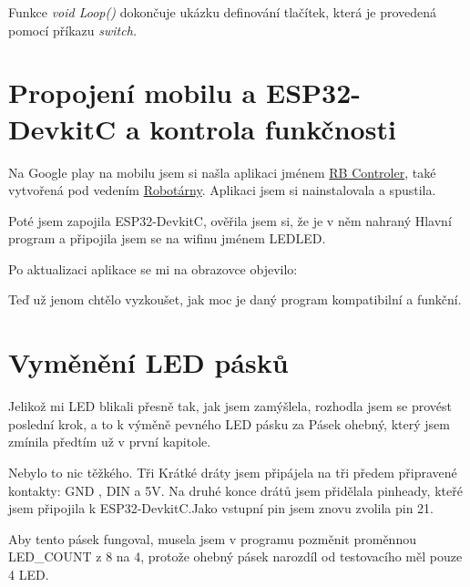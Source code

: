 Funkce {\em void Loop()} dokončuje ukázku definování tlačítek, která je provedená pomocí příkazu {\em switch.}






\newpage

\section{Propojení mobilu a ESP32-DevkitC a kontrola funkčnosti}
Na Google play na mobilu jsem si našla aplikaci jménem \href{https://play.google.com/store/apps/details?id=com.tassadar.rbcontroller}{RB Controler}, také vytvořená pod vedením \href{https://helceletka.cz/robotarna/}{Robotárny}. Aplikaci jsem si nainstalovala a spustila.

Poté jsem zapojila ESP32-DevkitC, ověřila jsem si, že je v něm nahraný Hlavní program a připojila jsem se na wifinu jménem LEDLED. 

Po aktualizaci aplikace se mi na obrazovce objevilo:


Teď už jenom chtělo vyzkoušet, jak moc je daný program kompatibilní a funkční.
 


\section{Vyměnění LED pásků}

Jelikož mi LED blikali přesně tak, jak jsem zamýšlela, rozhodla jsem se provést poslední krok, a to k výměně pevného LED pásku za Pásek ohebný, který jsem zmínila předtím už v první kapitole. 

Nebylo to nic  těžkého. Tři Krátké dráty jsem připájela na tři předem připravené kontakty: GND , DIN a 5V. Na druhé konce drátů jsem přidělala pinheady, kteřé jsem připojila k ESP32-DevkitC.Jako vstupní pin jsem znovu zvolila pin 21.


Aby tento pásek fungoval, musela jsem v programu pozměnit proměnnou LED_COUNT z 8 na 4, protože ohebný pásek narozdíl od testovacího měl pouze 4 LED.


\newpage
